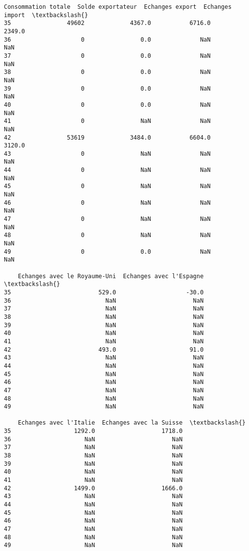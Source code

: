 \documentclass[11pt]{article}
\begin{document}
\begin{tcolorbox}[breakable, size=fbox, boxrule=.5pt, pad at break*=1mm, opacityfill=0]
\begin{Verbatim}[commandchars=\\\{\}]
    Consommation totale  Solde exportateur  Echanges export  Echanges import  \textbackslash{}
35                49602             4367.0           6716.0           2349.0
36                    0                0.0              NaN              NaN
37                    0                0.0              NaN              NaN
38                    0                0.0              NaN              NaN
39                    0                0.0              NaN              NaN
40                    0                0.0              NaN              NaN
41                    0                NaN              NaN              NaN
42                53619             3484.0           6604.0           3120.0
43                    0                NaN              NaN              NaN
44                    0                NaN              NaN              NaN
45                    0                NaN              NaN              NaN
46                    0                NaN              NaN              NaN
47                    0                NaN              NaN              NaN
48                    0                NaN              NaN              NaN
49                    0                0.0              NaN              NaN

    Echanges avec le Royaume-Uni  Echanges avec l'Espagne  \textbackslash{}
35                         529.0                    -30.0
36                           NaN                      NaN
37                           NaN                      NaN
38                           NaN                      NaN
39                           NaN                      NaN
40                           NaN                      NaN
41                           NaN                      NaN
42                         493.0                     91.0
43                           NaN                      NaN
44                           NaN                      NaN
45                           NaN                      NaN
46                           NaN                      NaN
47                           NaN                      NaN
48                           NaN                      NaN
49                           NaN                      NaN

    Echanges avec l'Italie  Echanges avec la Suisse  \textbackslash{}
35                  1292.0                   1718.0
36                     NaN                      NaN
37                     NaN                      NaN
38                     NaN                      NaN
39                     NaN                      NaN
40                     NaN                      NaN
41                     NaN                      NaN
42                  1499.0                   1666.0
43                     NaN                      NaN
44                     NaN                      NaN
45                     NaN                      NaN
46                     NaN                      NaN
47                     NaN                      NaN
48                     NaN                      NaN
49                     NaN                      NaN


\end{Verbatim}
\end{tcolorbox}
\end{document}
